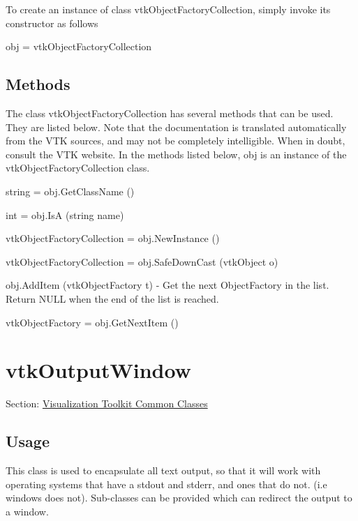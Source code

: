 To create an instance of class vtk\-Object\-Factory\-Collection, simply invoke its constructor as follows \begin{DoxyVerb}  obj = vtkObjectFactoryCollection
\end{DoxyVerb}
 \hypertarget{vtkwidgets_vtkxyplotwidget_Methods}{}\subsection{Methods}\label{vtkwidgets_vtkxyplotwidget_Methods}
The class vtk\-Object\-Factory\-Collection has several methods that can be used. They are listed below. Note that the documentation is translated automatically from the V\-T\-K sources, and may not be completely intelligible. When in doubt, consult the V\-T\-K website. In the methods listed below, {\ttfamily obj} is an instance of the vtk\-Object\-Factory\-Collection class. 
\begin{DoxyItemize}
\item {\ttfamily string = obj.\-Get\-Class\-Name ()}  
\item {\ttfamily int = obj.\-Is\-A (string name)}  
\item {\ttfamily vtk\-Object\-Factory\-Collection = obj.\-New\-Instance ()}  
\item {\ttfamily vtk\-Object\-Factory\-Collection = obj.\-Safe\-Down\-Cast (vtk\-Object o)}  
\item {\ttfamily obj.\-Add\-Item (vtk\-Object\-Factory t)} -\/ Get the next Object\-Factory in the list. Return N\-U\-L\-L when the end of the list is reached.  
\item {\ttfamily vtk\-Object\-Factory = obj.\-Get\-Next\-Item ()}  
\end{DoxyItemize}\hypertarget{vtkcommon_vtkoutputwindow}{}\section{vtk\-Output\-Window}\label{vtkcommon_vtkoutputwindow}
Section\-: \hyperlink{sec_vtkcommon}{Visualization Toolkit Common Classes} \hypertarget{vtkwidgets_vtkxyplotwidget_Usage}{}\subsection{Usage}\label{vtkwidgets_vtkxyplotwidget_Usage}
This class is used to encapsulate all text output, so that it will work with operating systems that have a stdout and stderr, and ones that do not. (i.\-e windows does not). Sub-\/classes can be provided which can redirect the output to a window.

